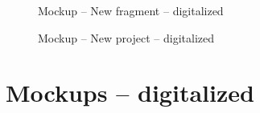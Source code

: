 \begin{appendix}
\begin{figure}[!h]
  \centering
  \caption{Mockup – New fragment – digitalized }
  \label{fig:1newCaseMockup}
\end{figure}

\begin{figure}[!h]
  \centering
  \caption{Mockup – New project – digitalized }
  \label{fig:mNewProjectMockup}
\end{figure}

\chapter{Mockups – digitalized}


\end{appendix}
